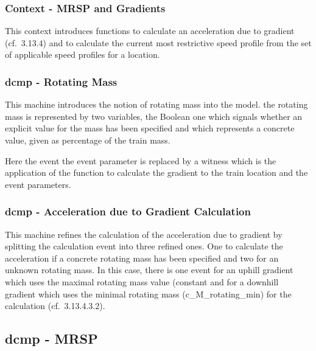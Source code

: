 \documentclass{template/openetcs_article}
\begin{document}
{\subsubsection{Context - MRSP and Gradients}
\label{sec:cont-mrsp-grad}

This context introduces functions to calculate an acceleration due to gradient
(cf.~3.13.4) and to calculate the current most restrictive speed profile from
the set of applicable speed profiles for a location.




\subsubsection{dcmp - Rotating Mass}
\label{sec:dcmp-rotating-mass}

This machine introduces the notion of rotating mass into the model. the rotating
mass is represented by two variables, the Boolean one
 which signals whether an explicit value for the
mass has been specified and  which represents a concrete
value, given as percentage of the train mass.

Here the event  the event parameter
 is replaced by a witness which is the application of the
function to calculate the gradient to the train location and the event
parameters.

{\footnotesize  }

\subsubsection{dcmp - Acceleration due to Gradient Calculation}
\label{sec:dcmp-accel-due}

This machine refines the calculation of the acceleration due to gradient by
splitting the calculation event into three refined ones. One to calculate the
acceleration if a concrete rotating mass has been specified and two for an
unknown rotating mass. In this case, there is one event for an uphill gradient
which uses the maximal rotating mass value (constant
 and for a downhill gradient which uses the minimal
rotating mass (c\_M\_rotating\_min) for the calculation (cf.~3.13.4.3.2).

{\footnotesize

}

\subsection{dcmp - MRSP}
\label{sec:dcmp-mrsp}

}
\end{document}
